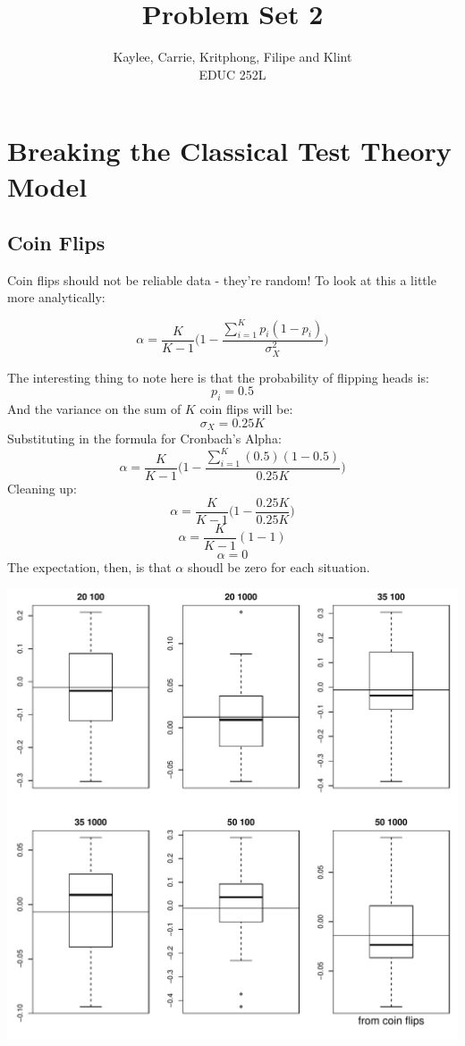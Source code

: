 \documentclass{article}\usepackage[]{graphicx}\usepackage[]{color}
\title{Problem Set 2}
\author{Kaylee, Carrie, Kritphong, Filipe and Klint \\ EDUC 252L}
\makeatletter
\def\maxwidth{ %
  \ifdim\Gin@nat@width>\linewidth
    \linewidth
  \else
    \Gin@nat@width
  \fi
}
\newenvironment{knitrout}{}{} %
\makeatother
\begin{document}
\maketitle
\section{Breaking the Classical Test Theory Model}

  \subsection{Coin Flips}
    Coin flips should not be reliable data - they're random!  To look at this a little more analytically:
    
      \[ \alpha = \frac{K}{K-1}\Bigg(1-\frac{\sum_{i=1}^{K}p_i(1-p_i)}{\sigma_{X}^{2}}\Bigg)\]
    
    The interesting thing to note here is that the probability of flipping heads is:
      \[p_i = 0.5 \]
    And the variance on the sum of $K$ coin flips will be:
      \[ \sigma_X = 0.25K \]
    Substituting in the formula for Cronbach's Alpha:
      \[ \alpha = \frac{K}{K-1}\Bigg(1-\frac{\sum_{i=1}^{K}(0.5)(1-0.5)}{0.25K}\Bigg)\]
    Cleaning up:
      \[ \alpha = \frac{K}{K-1}\Bigg(1-\frac{0.25K}{0.25K}\Bigg)\]
      \[ \alpha = \frac{K}{K-1}(1-1)\]
      \[ \alpha = 0 \]
    The expectation, then, is that $\alpha$ shoudl be zero for each situation.


\begin{knitrout}
\color{fgcolor}
\includegraphics[width=\maxwidth]{figure/unnamed-chunk-1-1} 

\end{knitrout}
\end{document}
